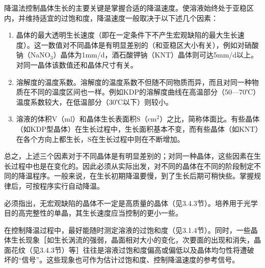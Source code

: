 降温法控制晶体生长的主要关键是掌握合适的降温速度。使溶液始终处于亚稳区内，并维持适宜的过饱和度，降温速度一般取决于以下述几个因素：
\begin{enumerate}[(1)]
\item 晶体的最大透明生长速度（即在一定条件下不产生宏观缺陷的最大生长速度）。这一数值对不同晶体是有明显差别的（和亚稳区大小有关），例如对硝酸钠（NaNO$_3$）晶体为1mm/d，酒石酸钾钠（KNT）晶体则可达5mm/d以上。对同一晶体该数值还和晶体尺寸有关。
\item 溶解度的温度系数。溶解度的温度系数不但随不同物质而异，而且对同一种物质在不同的温度区间也一样。例如KDP的溶解度曲线在高温部分（50---70℃）温度系数较大，在低温部分（30℃以下）则较小。
\item 溶液的体积V（ml）和晶体生长表面积S（cm$^2$）之比，简称体面比。有些晶体（如KDP型晶体）在生长过程中，生长面积基本不变，而有些晶体（如KNT）在各个方向上都生长，S在生长过程中则在不断增加。
\end{enumerate}

总之，上述三个因素对于不同晶体是有明显差别的；对同一种晶体，这些因素在生长过程中也是在变化的。因此必须从实际出发，对不同的晶体在不同的阶段制定不同的降温程序。一般来说，在生长初期降温要慢，到了生长后期可稍快些。掌握规律后，可按程序实行自动降温。

必须指出，无宏观缺陷的晶体不一定是高质量的晶体（见3.4.3节）。培养用于光学目的高完整性的单晶，其生长速度应当控制的更小一些。

在控制降温过程中，最好能随时测定溶液的过饱和度（见3.1.4节）。同时，一些晶体生长现象［如生长涡流的强弱，晶面相对大小的变化，次要面的出现和消失，晶面花纹（见3.4.3节）等］往往是溶液过饱和度偏高或偏低以及晶体均匀性将遭破坏的“信号”。这些现象也可作为估计过饱和度、控制降温速度的参考信号。